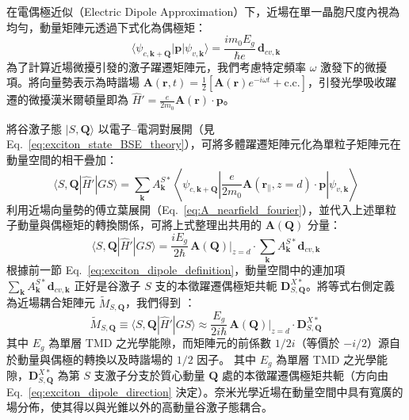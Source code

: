 在電偶極近似（Electric Dipole Approximation）下，近場在單一晶胞尺度內視為均勻，動量矩陣元透過下式化為偶極矩：
\begin{equation}
	\langle \psi_{c,\mathbf{k}+\mathbf{Q}} | \mathbf{p} | \psi_{v,\mathbf{k}} \rangle
	= \frac{im_0 E_g}{\hbar e}\,\mathbf{d}_{cv,\mathbf{k}}
\end{equation}
為了計算近場微擾引發的激子躍遷矩陣元，我們考慮特定頻率 $\omega$ 激發下的微擾項。將向量勢表示為時諧場 $\mathbf{A}(\mathbf{r}, t) = \frac{1}{2}[\mathbf{A}(\mathbf{r}) e^{-i\omega t} + \text{c.c.}]$，引發光學吸收躍遷的微擾漢米爾頓量即為 $\hat{H}' = \frac{e}{2m_0} \mathbf{A}(\mathbf{r}) \cdot \mathbf{p}$。

將谷激子態 $|S, \mathbf{Q}\rangle$ 以電子--電洞對展開（見 Eq.~\eqref{eq:exciton_state_BSE_theory}），可將多體躍遷矩陣元化為單粒子矩陣元在動量空間的相干疊加：
\begin{equation}
	\langle S, \mathbf{Q} | \hat{H}' | GS \rangle
	= \sum_{\mathbf{k}} A^{S*}_{\mathbf{k}} \left\langle \psi_{c,\mathbf{k}+\mathbf{Q}} \left| \frac{e}{2m_0} \mathbf{A}(\mathbf{r}_{\parallel}, z=d) \cdot \mathbf{p} \right| \psi_{v,\mathbf{k}} \right\rangle
\end{equation}
利用近場向量勢的傅立葉展開（Eq.~\eqref{eq:A_nearfield_fourier}），並代入上述單粒子動量與偶極矩的轉換關係，可將上式整理出共用的 $\mathbf{A}(\mathbf{Q})$ 分量：
\begin{equation}
	\langle S, \mathbf{Q} | \hat{H}' | GS \rangle
	= \frac{i E_g}{2\hbar} \, \mathbf{A}(\mathbf{Q})\big|_{z=d} \cdot \sum_{\mathbf{k}} A^{S*}_{\mathbf{k}} \mathbf{d}_{cv,\mathbf{k}}
\end{equation}
根據前一節 Eq.~\eqref{eq:exciton_dipole_definition}，動量空間中的連加項 $\sum_{\mathbf{k}} A^{S*}_{\mathbf{k}} \mathbf{d}_{cv,\mathbf{k}}$ 正好是谷激子 $S$ 支的本徵躍遷偶極矩共軛 $\mathbf{D}^{X*}_{S,\mathbf{Q}}$。將等式右側定義為近場耦合矩陣元 $\tilde{M}_{S,\mathbf{Q}}$，我們得到 \cite{Lin2024Phd,Haug2009}：
\begin{equation}
	\boxed{
		\tilde{M}_{S,\mathbf{Q}} \equiv \langle S, \mathbf{Q} | \hat{H}' | GS \rangle
		\approx \frac{E_g}{2i\hbar}\,
		\mathbf{A}(\mathbf{Q})\big|_{z=d} \cdot \mathbf{D}^{X*}_{S,\mathbf{Q}}
	}
	\label{eq:coupling_matrix_element_nearfield}
\end{equation}
其中 $E_g$ 為單層 TMD 之光學能隙，而矩陣元的前係數 $1/2i$（等價於 $-i/2$）源自於動量與偶極的轉換以及時諧場的 $1/2$ 因子。
其中 $E_g$ 為單層 TMD 之光學能隙，$\mathbf{D}^{X*}_{S,\mathbf{Q}}$ 為第 $S$ 支激子分支於質心動量 $\mathbf{Q}$ 處的本徵躍遷偶極矩共軛（方向由 Eq.~\eqref{eq:exciton_dipole_direction} 決定）。奈米光學近場在動量空間中具有寬廣的場分佈，使其得以與光錐以外的高動量谷激子態耦合。

